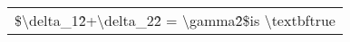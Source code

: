 \begin{tabular}{l}
\$\textbackslash{}delta\_1\^2+\textbackslash{}delta\_2\^2 = \textbackslash{}gamma\^2\$\newline{}is \textbackslash{}textbf{true} \\
\end{tabular}%
